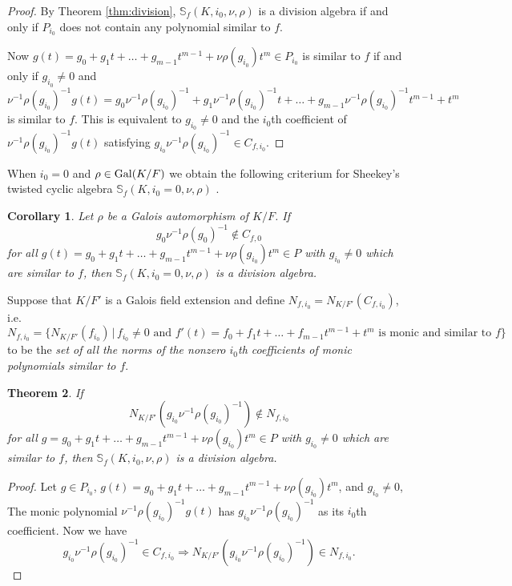 \documentclass[12pt]{amsart}
\theoremstyle{plain}
\newtheorem{theorem}{Theorem}[section]
\newtheorem{corollary}[theorem]{Corollary}
\theoremstyle{definition}
\numberwithin{equation}{section}
\numberwithin{figure}{section}
\begin{document}
\begin{proof}
 By Theorem \ref{thm:division},
$\mathbb{S}_f(K,i_0,\nu,\rho)$  is a division algebra if and only if  $ P_{i_0} $ does not contain any polynomial similar to $f$.

  Now $g(t)=g_0+g_1t+\dots+g_{m-1}t^{m-1}+\nu\rho(g_{i_0})t^m\in P_{i_0}$ is similar to $f$ if and only if  $g_{i_0}\not=0$
  and
$$\nu^{-1}\rho(g_{i_0})^{-1}g(t)=g_0\nu^{-1}\rho(g_{i_0})^{-1}+g_1\nu^{-1}\rho(g_{i_0})^{-1}t+\dots+g_{m-1} \nu^{-1}\rho(g_{i_0})^{-1}t^{m-1}+t^m$$
is similar to $f$. This is equivalent to  $g_{i_0}\not=0$ and the $i_{0}$th coefficient of $\nu^{-1}\rho(g_{i_0})^{-1}g(t)$
satisfying $ g_{i_0}\nu^{-1}\rho(g_{i_0})^{-1}\in C_{f,{i_0}}.$
\end{proof}



 When $i_0=0$ and $\rho\in {\rm Gal}(K/F)$ we obtain the following criterium for Sheekey's twisted cyclic algebra $\mathbb{S}_f(K,i_0=0,\nu,\rho)$  \cite{Sheekey}.


  \begin{corollary}\label{cor:Sh}
Let $\rho$  be a Galois automorphism of $K/F$.
 If $$ g_{0}\nu^{-1}\rho(g_{0})^{-1}\not\in C_{f,{0}}$$
 for all $g(t)=g_0+g_1t+\dots+g_{m-1}t^{m-1}+\nu\rho(g_{i_0})t^m\in P$ with $g_{i_0}\not=0$ which are similar to $f$, then $\mathbb{S}_f(K,i_0=0,\nu,\rho)$ is a division algebra.
 \end{corollary}


Suppose that $K/F'$ is a Galois field extension and define $N_{f,{i_0}}=N_{K/F'}(C_{f,{i_0}})$, i.e.
$$N_{f,{i_0}}=\{ N_{K/F'}(f_{i_0})\,|\, f_{i_0}\not=0 \text{ and } f' (t)=f_0+f_1t+\dots+f_{m-1}t^{m-1}+t^m \text{ is monic and similar to } f\}$$
 to be the \emph{set of all the norms of the nonzero $i_{0}$th coefficients of monic polynomials similar to $f$}.


 \begin{theorem}\label{thm:normstrong}
 If
 $$ N_{K/F'}(g_{i_0}\nu^{-1}\rho(g_{i_0})^{-1})\not\in N_{f,{i_0}}$$
  for all $g=g_0+g_1t+\dots+g_{m-1}t^{m-1}+\nu\rho(g_{i_0})t^m\in P$ with $g_{i_0}\not=0$ which are similar to $f$, then $\mathbb{S}_f(K,i_0,\nu,\rho)$ is a division algebra.
 \end{theorem}

 \begin{proof}
 Let $g\in P_{i_0}$,
 $g(t)=g_0+g_1t+\dots+g_{m-1}t^{m-1}+\nu\rho(g_{i_0})t^m$, and $g_{i_0}\not=0$,
 The monic polynomial $\nu^{-1}\rho(g_{i_0})^{-1}g(t)$ has
$ g_{i_0}\nu^{-1}\rho(g_{i_0})^{-1}$  as its $i_{0}$th coefficient.
Now we have
$$ g_{i_0}\nu^{-1}\rho(g_{i_0})^{-1}\in C_{f,{i_0}}\Rightarrow N_{K/F'}(g_{i_0}\nu^{-1}\rho(g_{i_0})^{-1})\in N_{f,{i_0}}.$$
\end{proof}
\end{document}

